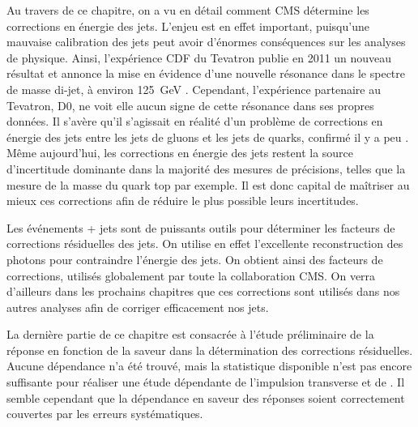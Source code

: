 Au travers de ce chapitre, on a vu en détail comment CMS détermine les corrections en énergie des jets. L'enjeu est en effet important, puisqu'une mauvaise calibration des jets peut avoir d'énormes conséquences sur les analyses de physique. Ainsi, l'expérience CDF du Tevatron publie en 2011 un nouveau résultat et annonce la mise en évidence d'une nouvelle résonance dans le spectre de masse di-jet, à environ \SI{125}{\GeV} \citep{CDF_old}. Cependant, l'expérience partenaire au Tevatron, D0, ne voit elle aucun signe de cette résonance dans ses propres données. Il s'avère qu'il s'agissait en réalité d'un problème de corrections en énergie des jets entre les jets de gluons et les jets de quarks, confirmé il y a peu \citep{CDF_new}. Même aujourd'hui, les corrections en énergie des jets restent la source d'incertitude dominante dans la majorité des mesures de précisions, telles que la mesure de la masse du quark top par exemple. Il est donc capital de maîtriser au mieux ces corrections afin de réduire le plus possible leurs incertitudes.

\bigskip

Les événements \Pphoton + jets sont de puissants outils pour déterminer les facteurs de corrections résiduelles des jets. On utilise en effet l'excellente reconstruction des photons pour contraindre l'énergie des jets. On obtient ainsi des facteurs de corrections, utilisés globalement par toute la collaboration CMS. On verra d'ailleurs dans les prochains chapitres que ces corrections sont utilisés dans nos autres analyses afin de corriger efficacement nos jets.

\bigskip

La dernière partie de ce chapitre est consacrée à l'étude préliminaire de la réponse en fonction de la saveur dans la détermination des corrections résiduelles. Aucune dépendance n'a été trouvé, mais la statistique disponible n'est pas encore suffisante pour réaliser une étude dépendante de l'impulsion transverse et de \aeta. Il semble cependant que la dépendance en saveur des réponses soient correctement couvertes par les erreurs systématiques.
